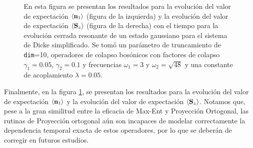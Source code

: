 \documentclass{report} %
\newcommand{\lgg}{\langle}
\newcommand{\rgg}{\rangle}
\numberwithin{equation}{section}
\begin{document}
\begin{figure}
    \centering
    \qquad
    \caption{En esta figura se presentan los resultados para la evolución del valor de expectación $\lgg { \bf n}_1 \rgg$ (figura de la izquierda) y la evolución del valor de expectación $\lgg { \bf S}_z \rgg$ (figura de la derecha) con el tiempo para la evolución cerrada resonante de un estado gaussiano para el sistema de Dicke simplificado. Se tomó un parámetro de truncamiento de \texttt{dim}=10, operadores de colapso bosónicos con factores de colapso $\gamma_1 = 0.05$, $\gamma_2 = 0.1$ y frecuencias $\omega_1 = 3$ y $\omega_2 = \sqrt{48}$ y una constante de acoplamiento $\lambda = 0.05$.}
    \label{ocupations_open_res}
\end{figure}

Finalmente, en la figura \ref{ocupations_open_res}, se presentan los resultados para la evolución del valor de expectación $\lgg {\bf n}_1 \rgg$ y la evolución del valor de expectación $\lgg {\bf S}_z \rgg$. Notamos que, pese a la gran similitud entre la eficacia de Max-Ent y Proyección Ortogonal, las rutinas de Proyección ortogonal aún son incapaces de modelar correctamente la dependencia temporal exacta de estos operadores, por lo que se deberán de corregir en futuros estudios.
\end{document}
